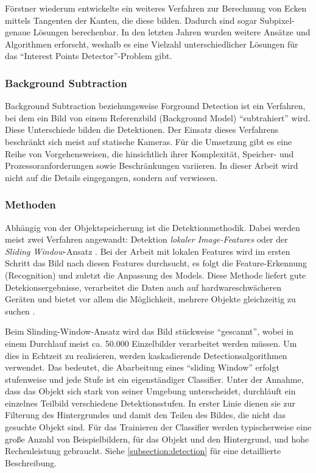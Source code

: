 Förstner \cite{FOD} wiederum entwickelte ein weiteres Verfahren zur Berechnung von Ecken mittels Tangenten der Kanten, die diese bilden. Dadurch sind sogar Subpixel-genaue Lösungen berechenbar. In den letzten Jahren wurden weitere Ansätze und Algorithmen erforscht, weshalb es eine Vielzahl unterschiedlicher Lösungen für das ``Interest Points Detector''-Problem gibt.

\subsubsection{Background Subtraction}
Background Subtraction beziehungsweise Forground Detection ist ein Verfahren, bei dem ein Bild von einem Referenzbild (Background Model) ``subtrahiert'' wird. Diese Unterschiede bilden die Detektionen. Der Einsatz dieses Verfahrens beschränkt sich meist auf statische Kameras. Für die Umsetzung gibt es eine Reihe von Vorgehensweisen, die hinsichtlich ihrer Komplexität, Speicher- und Prozessoranforderungen sowie Beschränkungen variieren. In dieser Arbeit wird nicht auf die Details eingegangen, sondern auf \cite{BAG} verwiesen.

\subsubsection{Methoden}
Abhängig von der Objektspeicherung ist die Detektionmethodik. Dabei werden meist zwei Verfahren angewandt: Detektion \textit{lokaler Image-Features}\cite{IMF} oder der \textit{Sliding Window}-Ansatz \cite{IIM}.
Bei der Arbeit mit lokalen Features wird im ersten Schritt das Bild nach diesen Features durchsucht, es folgt die Feature-Erkennung (Recognition) und zuletzt die Anpassung des Models. Diese Methode liefert gute Detekionsergebnisse, verarbeitet die Daten auch auf hardwareschwächeren Geräten und bietet vor allem die Möglichkeit, mehrere Objekte gleichzeitig zu suchen\cite{MTL} \cite{VAH} \cite{SLI}.

Beim Slinding-Window-Ansatz wird das Bild stückweise ``gescannt'', wobei in einem Durchlauf meist ca. 50.000 Einzelbilder verarbeitet werden müssen. Um dies in Echtzeit zu realisieren, werden kaskadierende Detectionsalgorithmen verwendet. Das bedeutet, die Abarbeitung eines ``sliding Window'' erfolgt stufenweise und jede Stufe ist ein eigenständiger Classifier. Unter der Annahme, dass das Objekt sich stark von seiner Umgebung unterscheidet, durchläuft ein einzelnes Teilbild verschiedene Detektionsstufen. In erster Linie dienen sie zur Filterung des Hintergrundes und damit den Teilen des Bildes, die nicht das gesuchte Objekt sind. Für das Trainieren der Classifier werden typischerweise eine große Anzahl von Beispielbildern, für das Objekt und den Hintergrund, und hohe Rechenleistung gebraucht. Siehe \ref{subsection:detection} für eine detaillierte Beschreibung.


